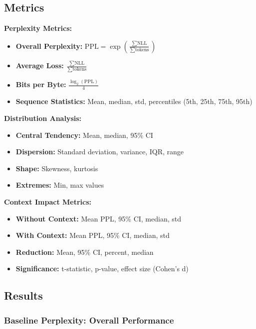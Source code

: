 \documentclass[11pt,a4paper]{article}
\begin{document}
\subsection{Metrics}

\textbf{Perplexity Metrics:}
\begin{itemize}
\item \textbf{Overall Perplexity:} $\text{PPL} = \exp\left(\frac{\sum \text{NLL}}{\sum \text{tokens}}\right)$
\item \textbf{Average Loss:} $\frac{\sum \text{NLL}}{\sum \text{tokens}}$
\item \textbf{Bits per Byte:} $\frac{\log_2(\text{PPL})}{4}$
\item \textbf{Sequence Statistics:} Mean, median, std, percentiles (5th, 25th, 75th, 95th)
\end{itemize}

\textbf{Distribution Analysis:}
\begin{itemize}
\item \textbf{Central Tendency:} Mean, median, 95\% CI
\item \textbf{Dispersion:} Standard deviation, variance, IQR, range
\item \textbf{Shape:} Skewness, kurtosis
\item \textbf{Extremes:} Min, max values
\end{itemize}

\textbf{Context Impact Metrics:}
\begin{itemize}
\item \textbf{Without Context:} Mean PPL, 95\% CI, median, std
\item \textbf{With Context:} Mean PPL, 95\% CI, median, std
\item \textbf{Reduction:} Mean, 95\% CI, percent, median
\item \textbf{Significance:} t-statistic, p-value, effect size (Cohen's d)
\end{itemize}

\subsection{Results}

\subsubsection{Baseline Perplexity: Overall Performance}
\end{document}
